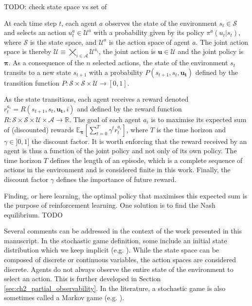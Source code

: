 TODO: check state space vs set of 

At each time step $t$, each agent $a$ observes the state of the environment $s_t \in \mathcal{S}$ and selects an action $u_t^a \in \mathcal{U}^a$ with a probability given by its policy $\pi^a(u_t|s_t)$, where $\mathcal{S}$ is the state space, and $\mathcal{U}^a$ is the action space of agent $a$.
The joint action space is thereby $\mathcal{U} \equiv \bigtimes_{i \in \mathcal{A}} \mathcal{U}^{a_i}$, the joint action is $\mathbf{u} \in \mathcal{U}$ and the joint policy is $\mathbf{\pi}$.
As a consequence of the $n$ selected actions, the state of the environment $s_t$ transits to a new state $s_{t+1}$ with a probability $P(s_{t+1}, s_t, \mathbf{u_t})$ defined by the transition function $P:\mathcal{S} \times \mathcal{S} \times \mathcal{U} \rightarrow [0,1]$.

As the state transitions, each agent receives a reward denoted $r_t^{a_i} = R(s_{t+1}, s_t, \mathbf{u_t}, i)$ and defined by the reward function $R: \mathcal{S} \times \mathcal{S} \times \mathcal{U} \times \mathcal{A} \rightarrow \mathbb{R}$.
The goal of each agent $a_i$ is to maximise its expected sum of (discounted) rewards $\mathbb{E}_{\mathbf{\pi}}\left[ \sum_{t=0}^{T} \gamma^t r^{a_i}_t \right]$, where $T$ is the time horizon and $\gamma \in ]0, 1]$ the discount factor.
It is worth enforcing that the reward received by an agent is thus a function of the joint policy and not only of its own policy.
The time horizon $T$ defines the length of an episode, which is a complete sequence of actions in the environment and is considered finite in this work.
Finally, the discount factor $\gamma$ defines the importance of future reward.

Finding, or here learning, the optimal policy that maximises this expected sum is the purpose of reinforcement learning.
One solution is to find the Nash equilibrium.
TODO

Several comments can be addressed in the context of the work presented in this manuscript.
In the stochastic game definition, some include an initial state distribution which we keep implicit (e.g. \citep{marl-book}).
While the state space can be composed of discrete or continuous variables, the action spaces are considered discrete.
Agents do not always observe the entire state of the environment to select an action.
This is further developed in Section \ref{sec:ch2_partial_observability}.
In the literature, a stochastic game is also sometimes called a Markov game (e.g. \citep{MarkovGames}).


